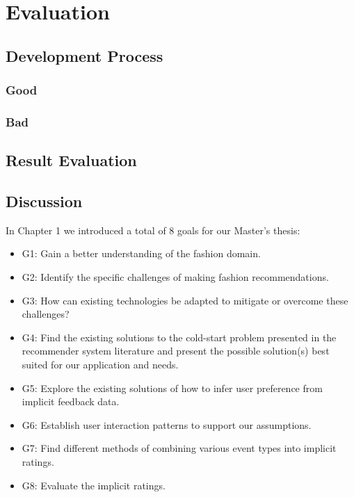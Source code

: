 
\chapter{Evaluation}
\minitoc

\clearpage



\section{Development Process}

\subsection*{Good}

\subsection*{Bad}



\section{Result Evaluation}
\label{sec:result-evaluation}




\section{Discussion}

In Chapter 1 we introduced a total of 8 goals for our Master's thesis:

\begin{itemize}
\item G1: Gain a better understanding of the fashion domain.
\item G2: Identify the specific challenges of making fashion recommendations.
\item G3: How can existing technologies be adapted to mitigate or overcome these challenges?
\item G4: Find the existing solutions to the cold-start problem presented in the recommender system literature
	      and present the possible solution(s) best suited for our application and needs.
\item G5: Explore the existing solutions of how to infer user preference from implicit feedback data.
\item G6: Establish user interaction patterns to support our assumptions.
\item G7: Find different methods of combining various event types into implicit ratings.
\item G8: Evaluate the implicit ratings.
\end{itemize}

